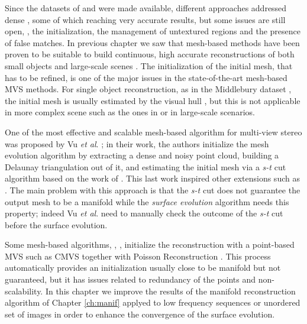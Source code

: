 Since the datasets of \cite{seitz_et_al06} and \cite{strecha2008} were made available, different approaches addressed dense \mvs, some of which reaching very accurate results, but some issues are still open, \eg, the initialization, the management of untextured regions and the presence of false matches.
In previous chapter we saw that mesh-based methods have been proven to be suitable to build continuous, high accurate reconstructions of both small objects and large-scale scenes \cite{hiep2009towards,vu_et_al_2012,salman2010surface}. 
The initialization of the initial mesh, that has to be refined, is one of the major issues in the state-of-the-art mesh-based MVS methods. For single object reconstruction, as in the Middlebury dataset \cite{seitz_et_al06}, the initial mesh is usually estimated by the visual hull \cite{laurentini1994visual}, but this is not applicable in more complex scene such as the ones in \cite{strecha2008} or in large-scale scenarios.

One of the most effective and scalable mesh-based algorithm for multi-view stereo was proposed by Vu \emph{et al}. \cite{vu_et_al_2012}; in their work, the authors initialize the mesh evolution algorithm by extracting a dense and noisy point cloud, building a Delaunay triangulation out of it, and estimating the initial mesh via a \emph{s-t} cut algorithm based on the work of \cite{labatut2007efficient}. 
This last work inspired other extensions such as \cite{jancosek2011multi}.
The main problem with this approach is that the \emph{s-t} cut does not guarantee the output mesh to be a manifold while the \emph{surface evolution} algorithm needs this property; indeed Vu \emph{et al}.  need to manually check the outcome of the \emph{s-t} cut before the surface evolution.

Some mesh-based algorithms, \eg, \cite{pan2015automatic,li2015detail}, initialize the reconstruction with a point-based MVS such as CMVS \cite{fu10} together with Poisson Reconstruction \cite{kazhdan2006poisson}.
This process automatically provides an initialization usually close to be manifold but not guaranteed, but it has issues related to redundancy of the points and non-scalability.
In this chapter we improve the results of the manifold reconstruction algorithm of Chapter {\ref{ch:manif}} applyed to low frequency sequences or unordered set of images in order to enhance the convergence of the surface evolution.

